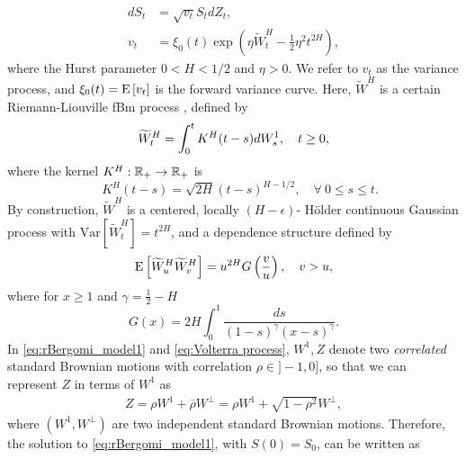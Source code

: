 \begin{align}\label{eq:rBergomi_model1}
	dS_t &= \sqrt{v_t} S_t dZ_t, \nonumber \\
	v_t &= \xi_0(t) \exp\left( \eta \widetilde{W}_t^H - \frac{1}{2} \eta^2 t^{2H} \right),
\end{align}
where the Hurst parameter $0 < H < 1/2$  and  $\eta>0$. We refer to $v_t$ as the variance process, and $\xi_0(t) = \mathrm{E}\left[v_t\right]$ is  the forward variance curve.  Here, $\widetilde{W}^H $ is a certain Riemann-Liouville fBm
process \cite{marinucci1999alternative,picard2011representation},  defined by
\begin{align}\label{eq:Volterra process}
	\widetilde{W}_t^H = \int_0^t K^H(t-s) dW_s^1, \quad t \ge 0 ,
\end{align}
where the kernel $K^H : \mathbb{R}_+  \rightarrow \mathbb{R}_+$ is
\begin{equation*}
 \quad K^H(t-s) = \sqrt{2H} (t-s)^{H - 1/2},\quad \forall \: 0 \le s \le t.
\end{equation*}
By construction, $\widetilde{W}^H $ is a centered, locally $(H-\epsilon)$- H\"older continuous Gaussian process with $\text{Var}\left[\widetilde{W}^H_t \right] = t^{2H}$, and a dependence structure defined by 
 \begin{equation*}
 \mathrm{E}\left[\widetilde{W}^H_u  \widetilde{W}^H_v\right]=u^{2H} G\left(\frac{v}{u} \right),\quad v >u ,
 \end{equation*}
 where for $x \ge 1$ and $\gamma=\frac{1}{2}-H$
 \begin{equation*}
G(x)=2H \int_{0}^1 \frac{ds}{(1-s)^{\gamma} (x-s)^{\gamma}}.
 \end{equation*}
%
In \eqref{eq:rBergomi_model1} and \eqref{eq:Volterra process}, $W^1, Z$ denote two \emph{correlated} standard Brownian motions with correlation $\rho \in ]-1,0]$, so that we can represent $Z$ in terms of $W^1$ as
\begin{align*}
	Z=\rho	W^1+ \bar{\rho}W^\perp = \rho W^1+\sqrt{1-\rho^2} W^\perp,
\end{align*}
where $(W^1,W^\perp)$ are two independent standard Brownian motions.
Therefore, the solution to \eqref{eq:rBergomi_model1}, with $S(0)=S_0$, can be written as 


